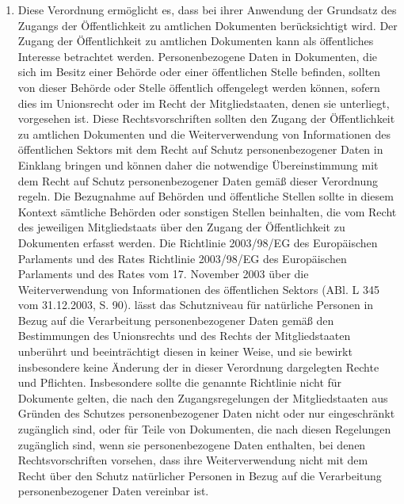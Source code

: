 \begin{enumerate}
   \item Diese Verordnung ermöglicht es, dass bei ihrer Anwendung der Grundsatz des Zugangs der Öffentlichkeit zu
    amtlichen Dokumenten berücksichtigt wird. Der Zugang der Öffentlichkeit zu amtlichen Dokumenten kann als
    öffentliches Interesse betrachtet werden. Personenbezogene Daten in Dokumenten, die sich im Besitz einer Behörde
    oder einer öffentlichen Stelle befinden, sollten von dieser Behörde oder Stelle öffentlich offengelegt werden
    können, sofern dies im Unionsrecht oder im Recht der Mitgliedstaaten, denen sie unterliegt, vorgesehen ist. Diese
    Rechtsvorschriften sollten den Zugang der Öffentlichkeit zu amtlichen Dokumenten und die Weiterverwendung von
    Informationen des öffentlichen Sektors mit dem Recht auf Schutz personenbezogener Daten in Einklang bringen und
    können daher die notwendige Übereinstimmung mit dem Recht auf Schutz personenbezogener Daten gemäß dieser
    Verordnung regeln. Die Bezugnahme auf Behörden und öffentliche Stellen sollte in diesem Kontext sämtliche Behörden
    oder sonstigen Stellen beinhalten, die vom Recht des jeweiligen Mitgliedstaats über den Zugang der Öffentlichkeit
    zu Dokumenten erfasst werden. Die Richtlinie 2003/98/EG des Europäischen Parlaments und des Rates\comment
    {Richtlinie 2003/98/EG des Europäischen Parlaments und des Rates vom 17. November 2003 über die Weiterverwendung
    von Informationen des öffentlichen Sektors (ABl. L 345 vom 31.12.2003, S. 90).} lässt das Schutzniveau für
    natürliche Personen in Bezug auf die Verarbeitung personenbezogener Daten gemäß den Bestimmungen des Unionsrechts
    und des Rechts der Mitgliedstaaten unberührt und beeinträchtigt diesen in keiner Weise, und sie bewirkt
    insbesondere keine Änderung der in dieser Verordnung dargelegten Rechte und Pflichten. Insbesondere sollte die
    genannte Richtlinie nicht für Dokumente gelten, die nach den Zugangsregelungen der Mitgliedstaaten aus Gründen des
    Schutzes personenbezogener Daten nicht oder nur eingeschränkt zugänglich sind, oder für Teile von Dokumenten, die
    nach diesen Regelungen zugänglich sind, wenn sie personenbezogene Daten enthalten, bei denen Rechtsvorschriften
    vorsehen, dass ihre Weiterverwendung nicht mit dem Recht über den Schutz natürlicher Personen in Bezug auf die
    Verarbeitung personenbezogener Daten vereinbar ist.%
   \label{itm:eg-154}
   


\end{enumerate}
